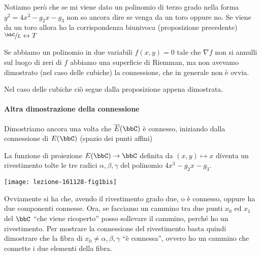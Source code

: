 \begin{osservazione}
  Notiamo però che se mi viene dato un polinomio di terzo grado nella
  forma $y^2 = 4x^3 - g_2 x - g_3$ non so ancora dire se venga da un
  toro oppure no. Se viene da un toro allora ho la corrispondenza
  biunivoca (proposizione precedente) $\sfrac{\bbC}{L} \leftrightarrow T$
\end{osservazione}

\begin{osservazione}
  Se abbiamo un polinomio in due variabili $f(x, y) = 0$ tale che
  $\nabla f$ non si annulli sul luogo di zeri di $f$ abbiamo una
  superficie di Riemman, ma non avevamo dimostrato (nel caso delle
  cubiche) la connessione, che in generale non è ovvia.

  Nel caso delle cubiche ciò segue dalla proposizione appena dimostrata.
\end{osservazione}

\paragraph{Altra dimostrazione della connessione} Dimostriamo ancora una
volta che $\ol{E}(\bbC)$ è connesso, iniziando dalla connessione di
$E(\bbC)$ (spazio dei punti affini)


La funzione di proiezione $E(\bbC) \rar \bbC$ definita da $(x, y) \mapsto x$ 
diventa un rivestimento tolte le tre radici $\alpha, \beta, \gamma$ del
polinomio $4x^3 - g_2 x - g_3$.


\begin{center}
  \texttt{[image: lezione-161128-fig1bis]}
\end{center}


Ovviamente si ha che, avendo il rivestimento grado due, o è connesso,
oppure ha due componenti connesse. Ora, se facciamo un cammino tra due
punti $x_0$ ed $x_1$ del $\bbC$ ``che viene ricoperto'' posso sollevare
il cammino, perché ho un rivestimento. Per mostrare la connessione del
rivestimento basta quindi dimostrare che la fibra di $x_0 \neq \alpha,
\beta, \gamma$ ``è connessa'', ovvero ho un cammino che connette i due
elementi della fibra.

